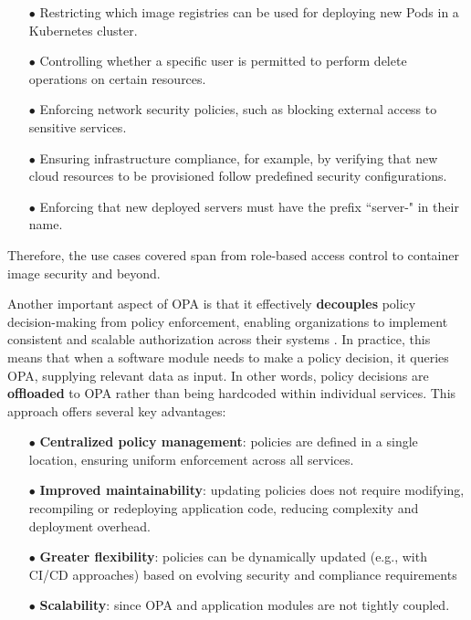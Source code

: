\begin{itemize}[itemsep=0.2pt, topsep=1pt] \item[$\bullet$] Restricting which image registries can be used for deploying new Pods in a Kubernetes cluster.
\item[$\bullet$] Controlling whether a specific user is permitted to perform delete operations on certain resources.
\item[$\bullet$] Enforcing network security policies, such as blocking external access to sensitive services.
\item[$\bullet$] Ensuring infrastructure compliance, for example, by verifying that new cloud resources to be provisioned follow predefined security configurations.
\item[$\bullet$] Enforcing that new deployed servers must have the prefix ``server-" in their name.
\end{itemize}

Therefore, the use cases covered span from role-based access control to container image security and beyond.
\newline


Another important aspect of OPA is that it effectively \textbf{decouples} policy decision-making from policy enforcement, enabling organizations to implement consistent and scalable authorization across their systems \cite{test}.
In practice, this means that when a software module needs to make a policy decision, it queries OPA, supplying relevant data as input. In other words, policy decisions are \textbf{offloaded} to OPA rather than being hardcoded within individual services. This approach offers several key advantages:
\begin{itemize}[itemsep=0.2pt, topsep=1pt]
  \item[$\bullet$] \textbf{Centralized policy management}: policies are defined in a single location, ensuring uniform enforcement across all services.
  \item[$\bullet$] \textbf{Improved maintainability}: updating policies does not require modifying, recompiling or redeploying application code, reducing complexity and deployment overhead.
  \item[$\bullet$] \textbf{Greater flexibility}: policies can be dynamically updated (e.g., with CI/CD approaches) based on evolving security and compliance requirements 
  \item[$\bullet$] \textbf{Scalability}: since OPA and application modules are not tightly coupled.
\end{itemize} 

